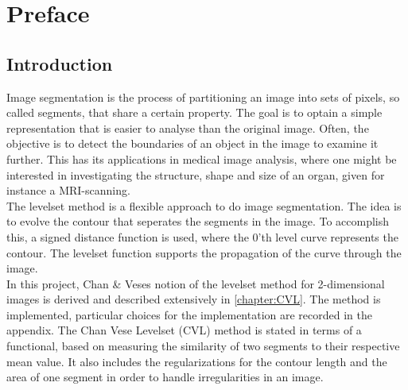 
\chapter{Preface}\label{chapter:preface}
\section{Introduction}
Image segmentation is the process of partitioning an image into sets of pixels, so called segments, that share a certain property. The goal is to optain a simple representation that is easier to analyse than the original image. Often, the objective is to detect the boundaries of an object in the image to examine it further. This has its applications in medical image analysis, where one might be interested in investigating the structure, shape and size of an organ, given for instance a MRI-scanning.\\

The levelset method is a flexible approach to do image segmentation. The idea is to evolve the contour that seperates the segments in the image. To accomplish this, a signed distance function is used, where the 0'th level curve represents the contour. The levelset function supports the propagation of the curve through the image.\\

In this project, Chan \& Veses notion of the levelset method for 2-dimensional images is derived and described extensively in \cref{chapter:CVL}. The method is implemented, particular choices for the implementation are recorded in the appendix. The Chan Vese Levelset (CVL) method is stated in terms of a functional, based on measuring the similarity of two segments to their respective mean value. It also includes the regularizations for the contour length and the area of one segment in order to handle irregularities in an image.\\

